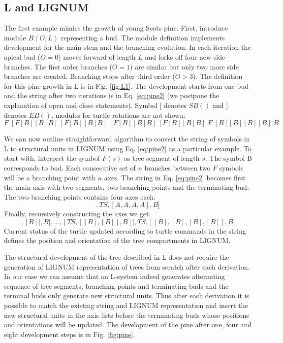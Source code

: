\subsection{L and LIGNUM}\label{sec:pine}
The  first example  mimics the  growth  of young  Scots pine.   First,
introduce module  $B(O,L)$ representing a bud.   The module definition
implements development for the  main stem and the branching evolution.
In each iteration the apical bud ($O = 0$) moves forward of length $L$
and forks off four new side  branches.  The first order branches ($O =
1$)  are  similar  but  only  two  more  side  branches  are  created.
Branching stops after third order  ($O > 3$).  The definition for this
pine growth in L is in Fig.  \ref{fig:L1}. The development starts from
one bud and  the string after two iterations  is in Eq. \ref{eq:pine2}
(we postpone the  explanation of open and close  statements). Symbol [
denotes $SB()$ and ] denotes  $EB()$, modules for turtle rotations are
not shown:
\begin{equation}\label{eq:pine2}
F\;[F[B][B]B]\:[F[B][B]B]\:[F[B][B]B]\:[F[B][B]B]\; F \;[B][B][B][B]\; B
\end{equation}

We can now outline straightforward  algorithm to convert the string of
symbols in L to structural units in LIGNUM using Eq. \ref{eq:pine2} as
a particular example.   To start with, interpret the  symbol $F(s)$ as
tree segment  of length $s$.  The  symbol B corresponds  to bud.  Each
consecutive  set of $n$  branches between  two $F$  symbols will  be a
branching  point with  $n$ axes.   The string  in  Eq.  \ref{eq:pine2}
becomes first  the main axis  with two segments, two  branching points
and the terminating bud:
\begin{equation}
[TS, BP, TS, BP, B]
\end{equation}
The two branching points contains four axes each:
\begin{equation}
[TS, [A,A,A,A], TS, [A,A,A,A], B]
\end{equation}
Finally, recursively constructing the axes we get:
\begin{equation}
[TS, [TS,[[B],[B]],B],\ldots, [TS,[[B],[B]],B]], TS, [[B],[B],[B],[B]], B]
\end{equation}
Current status of  the turtle updated according to  turtle commands in
the  string   defines  the  position  and  orientation   of  the  tree
compartments in LIGNUM.

The structural development of the tree described in L does not require
the generation  of LIGNUM representation  of trees from  scratch after
each derivation.   In our case we  can assume that  an L-system indeed
generates alternating sequence of  tree segments, branching points and
terminating buds  and the terminal  buds only generate  new structural
units.   Thus  after each  derivation  it  is  possible to  match  the
existing  string   and  LIGNUM  representation  and   insert  the  new
structural units in  the axis lists before the  terminating buds whose
positions and  orientations will be  updated.  The development  of the
pine  after  one,  four  and   eight  development  steps  is  in  Fig.
\ref{fig:pine}.



